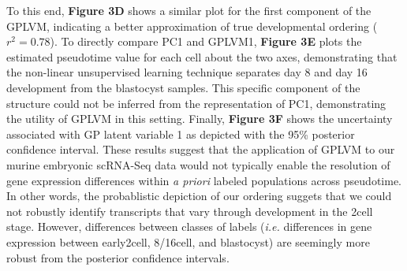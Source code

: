 \documentclass[english, 11pt]{article}\usepackage[]{graphicx}\usepackage[]{color}
\begin{document}
To this end, \textbf{Figure 3D} shows a similar plot for the first component of the GPLVM, indicating a better approximation of true developmental ordering ($r^2 = 0.78$). To directly compare PC1 and GPLVM1, \textbf{Figure 3E} plots the estimated pseudotime value for each cell about the two axes, demonstrating that the non-linear unsupervised learning technique separates day 8 and day 16 development from the blastocyst samples. This specific component of the structure could not be inferred from the representation of PC1, demonstrating the utility of GPLVM in this setting. Finally, \textbf{Figure 3F} shows the uncertainty associated with GP latent variable 1 as depicted with the 95\% posterior confidence interval. These results suggest that the application of GPLVM to our murine embryonic scRNA-Seq data would not typically enable the resolution of gene expression differences within \textit{a priori} labeled populations across pseudotime. In other words, the probablistic depiction of our ordering suggets that we could not robustly identify transcripts that vary through development in the 2cell stage. However, differences between classes of labels (\textit{i.e.} differences in gene expression between early2cell, 8/16cell, and blastocyst) are seemingly more robust from the posterior confidence intervals.
\end{document}
